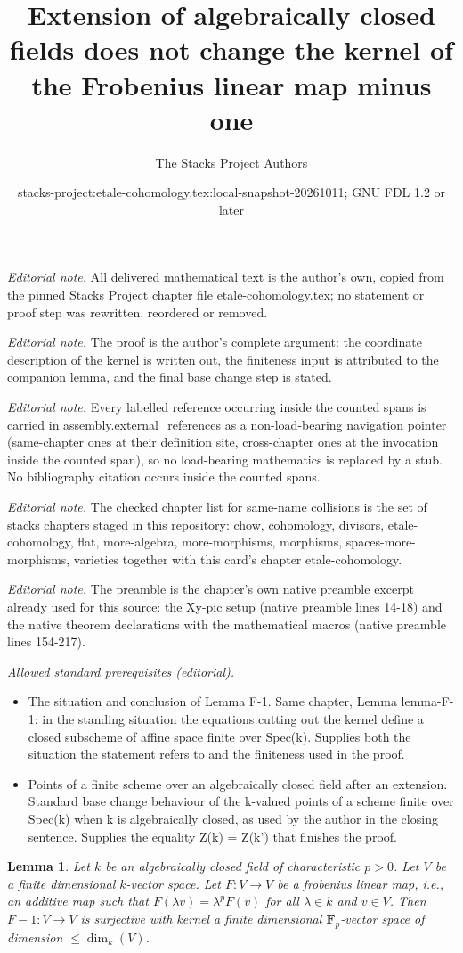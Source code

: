 \documentclass[10pt,a4paper]{amsart}
\title{Extension of algebraically closed fields does not change the kernel of the Frobenius linear map minus one}
\author{The Stacks Project Authors}
\date{stacks-project:etale-cohomology.tex:local-snapshot-20261011; GNU FDL 1.2 or later}
\theoremstyle{plain}
\newtheorem{lemma}[subsection]{Lemma}
\theoremstyle{definition}
\theoremstyle{remark}
\numberwithin{equation}{subsection}
\begin{document}
\maketitle
\noindent\textit{Editorial note.} All delivered mathematical text is the author's own, copied from the pinned Stacks Project chapter file etale-cohomology.tex; no statement or proof step was rewritten, reordered or removed.\par\medskip
\noindent\textit{Editorial note.} The proof is the author's complete argument: the coordinate description of the kernel is written out, the finiteness input is attributed to the companion lemma, and the final base change step is stated.\par\medskip
\noindent\textit{Editorial note.} Every labelled reference occurring inside the counted spans is carried in assembly.external\_references as a non-load-bearing navigation pointer (same-chapter ones at their definition site, cross-chapter ones at the invocation inside the counted span), so no load-bearing mathematics is replaced by a stub. No bibliography citation occurs inside the counted spans.\par\medskip
\noindent\textit{Editorial note.} The checked chapter list for same-name collisions is the set of stacks chapters staged in this repository: chow, cohomology, divisors, etale-cohomology, flat, more-algebra, more-morphisms, morphisms, spaces-more-morphisms, varieties together with this card's chapter etale-cohomology.\par\medskip
\noindent\textit{Editorial note.} The preamble is the chapter's own native preamble excerpt already used for this source: the Xy-pic setup (native preamble lines 14-18) and the native theorem declarations with the mathematical macros (native preamble lines 154-217).\par\medskip
\noindent\textit{Allowed standard prerequisites (editorial).}\begin{itemize}
\item The situation and conclusion of Lemma F-1. Same chapter, Lemma lemma-F-1: in the standing situation the equations cutting out the kernel define a closed subscheme of affine space finite over Spec(k). Supplies both the situation the statement refers to and the finiteness used in the proof.
\item Points of a finite scheme over an algebraically closed field after an extension. Standard base change behaviour of the k-valued points of a scheme finite over Spec(k) when k is algebraically closed, as used by the author in the closing sentence. Supplies the equality Z(k) = Z(k') that finishes the proof.
\end{itemize}\medskip
\begin{lemma}
\label{lemma-F-1}
Let $k$ be an algebraically closed field of characteristic $p > 0$.
Let $V$ be a finite dimensional $k$-vector space. Let $F : V \to V$
be a frobenius linear map, i.e., an additive map such that
$F(\lambda v) = \lambda^p F(v)$ for all $\lambda \in k$ and $v \in V$.
Then $F - 1 : V \to V$ is surjective with kernel a finite dimensional
$\mathbf{F}_p$-vector space of dimension $\leq \dim_k(V)$.
\end{lemma}
\end{document}

